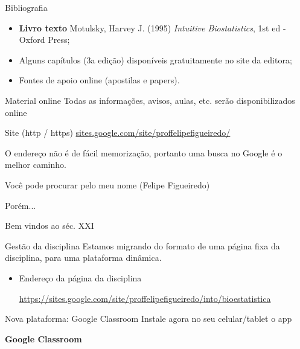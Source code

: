 \documentclass{beamer}
\begin{document}

\begin{frame}{\scriptsize Bibliografia}
  \begin{itemize}
  \item {\bf Livro texto} Motulsky, Harvey J. (1995) {\em Intuitive Biostatistics}, 1st ed - Oxford Press;
  \item Alguns capítulos (3a edição) disponíveis gratuitamente no site da editora;
  \item Fontes de apoio online (apostilas e papers).
  \end{itemize}
\end{frame}

\begin{frame}{\scriptsize Material online}
  Todas as informações, avisos, aulas, etc. serão disponibilizados online
  \begin{block}{Site (http / https)}
    \footnotesize
    \url{sites.google.com/site/proffelipefigueiredo/}
  \end{block}

  \bigskip
  O endereço não é de fácil memorização, portanto uma busca no Google é o melhor caminho.

  \bigskip
  Você pode procurar pelo meu nome (Felipe Figueiredo)

  \bigskip
  \bigskip
  Porém...
\end{frame}

\begin{frame}{\scriptsize Bem vindos ao séc. XXI}
  \begin{block}{Gestão da disciplina}
    \footnotesize
    Estamos migrando do formato de uma página fixa da disciplina, para uma plataforma dinâmica.
  \end{block}
  \begin{itemize}
  \item Endereço da página da disciplina

    \url{https://sites.google.com/site/proffelipefigueiredo/into/bioestatistica}
  \end{itemize}
  \begin{block}{Nova plataforma: Google Classroom}
    \footnotesize
    Instale agora no seu celular/tablet o app

    \bigskip
    {\bf Google Classroom}
  \end{block}
\end{frame}
\end{document}
